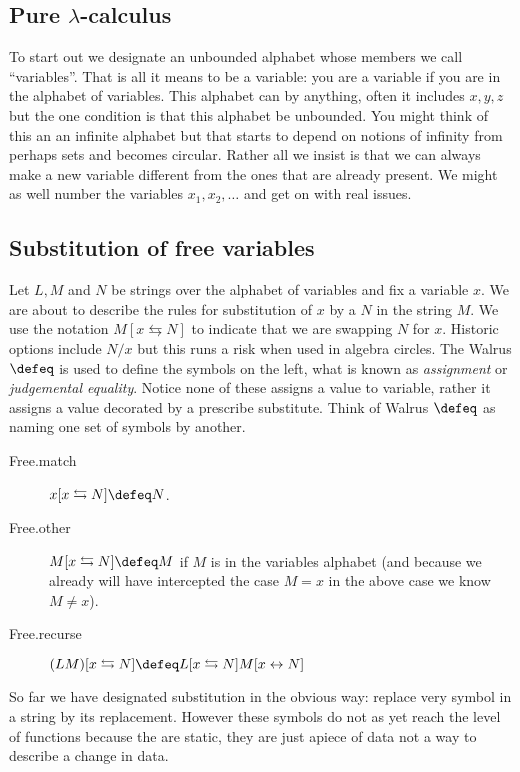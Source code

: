 \subsection{Pure $\lambda$-calculus}

To start out we designate an unbounded alphabet whose members we call
``variables''. That is all it means to be a variable: you are a variable if you
are in the alphabet of variables.  This alphabet can by anything, often it
includes $x,y,z$ but the one condition is that this alphabet be unbounded.  You
might think of this an an infinite alphabet but that starts to depend on notions
of infinity from perhaps sets and becomes circular. Rather all we insist is that
we can always make a new variable different from the ones that are already
present.  We might as well number the variables $x_1,x_2,\ldots$ and get on with
real issues.

\subsection{Substitution of free variables}
Let $L, M$ and $N$ be strings over the alphabet of variables
and fix a variable $x$.  We are about to describe the rules for substitution 
of $x$ by a $N$ in the string $M$.  We use the notation $M[x\leftrightarrows N]$ 
to indicate that we are swapping $N$ for $x$.  Historic 
options include $N/x$ but this runs a risk when used in algebra circles.
The Walrus $\defeq$ is used to define the symbols on the left, what is 
known as \emph{assignment} or \emph{judgemental equality}.  Notice none of 
these assigns a value to variable, rather it assigns a value decorated by 
a prescribe substitute.  Think of Walrus $\defeq$ as naming one set of symbols 
by another.
\begin{description}
    \item[Free.match] $x[x\leftrightarrows N]\defeq N$.
    \item[Free.other] $M[x\leftrightarrows N]\defeq M$ if $M$ is in the variables alphabet (and 
    because we already will have intercepted the case $M=x$ in the above case we know $M\neq x$).
    
    \item[Free.recurse] $(LM)[x\leftrightarrows N]\defeq L[x\leftrightarrows N]M[x\leftrightarrow N]$
\end{description}
So far we have designated substitution in the obvious way: replace very 
symbol in a string by its replacement.  However these symbols do not as 
yet reach the level of functions because the are static, they are just 
apiece of data not a way to describe a change in data.

